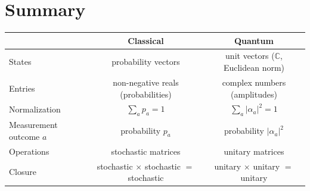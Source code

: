 \documentclass[11pt]{article}
\theoremstyle{definition}
\begin{document}
\section{Summary}

\begin{center}
\begin{tabular}{lcc}
\hline
 & \textbf{Classical} & \textbf{Quantum} \\\hline
States & probability vectors & unit vectors ($\mathbb{C}$, Euclidean norm) \\
Entries & non-negative reals (probabilities) & complex numbers (amplitudes) \\
Normalization & $\sum_a p_a = 1$ & $\sum_a |\alpha_a|^2 = 1$ \\
Measurement outcome $a$ & probability $p_a$ & probability $|\alpha_a|^2$ \\
Operations & stochastic matrices & unitary matrices \\
Closure & stochastic $\times$ stochastic $=$ stochastic & unitary $\times$ unitary $=$ unitary \\
\hline
\end{tabular}
\end{center}
\end{document}
